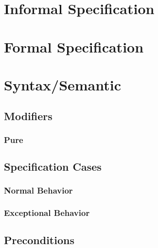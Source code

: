 \documentclass[a4paper, 11pt, accentcolor = tud3b]{tudreport}
\begin{document}
        \section{Informal Specification} %

        \section{Formal Specification} %

        \section{Syntax/Semantic} %

            \subsection{Modifiers} %

                \subsubsection{Pure} %

            \subsection{Specification Cases} %

                \subsubsection{Normal Behavior} %

                \subsubsection{Exceptional Behavior} %

            \subsection{Preconditions} %
\end{document}
